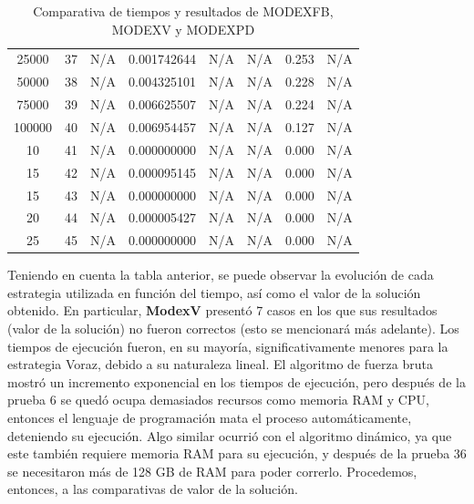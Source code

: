 \documentclass[letterpaper,10pt]{article}
\begin{document}
\begin{table}[H]
{\begin{tabular}{|c|c|c|c|c|c|c|c|}
      25000 & 37  & N/A        & \cellcolor{sgreen}0.001742644 & N/A & N/A    & \cellcolor{syellow}0.253  & N/A    \\
      50000 & 38  & N/A        & \cellcolor{sgreen}0.004325101 & N/A & N/A    & \cellcolor{syellow}0.228  & N/A    \\
      75000 & 39  & N/A        & \cellcolor{sgreen}0.006625507 & N/A & N/A    & \cellcolor{syellow}0.224  & N/A    \\
      100000 & 40 & N/A        & \cellcolor{sgreen}0.006954457 & N/A & N/A    & \cellcolor{syellow}0.127  & N/A    \\
      10   & 41   & N/A        & \cellcolor{sgreen}0.000000000 & N/A & N/A    & \cellcolor{syellow}0.000  & N/A    \\
      15   & 42   & N/A        & \cellcolor{sgreen}0.000095145 & N/A & N/A    & \cellcolor{syellow}0.000  & N/A    \\
      15   & 43   & N/A        & \cellcolor{sgreen}0.000000000 & N/A & N/A    & \cellcolor{syellow}0.000  & N/A    \\
      20   & 44   & N/A        & \cellcolor{sgreen}0.000005427 & N/A & N/A    & \cellcolor{syellow}0.000  & N/A    \\
      25   & 45   & N/A        & \cellcolor{sgreen}0.000000000 & N/A & N/A    & \cellcolor{syellow}0.000  & N/A    \\
      \hline
  \end{tabular}
  }
  \caption{Comparativa de tiempos y resultados de MODEXFB, MODEXV y MODEXPD}
  \label{tab:modex_comparativa}
\end{table}

Teniendo en cuenta la tabla anterior, se puede observar la evolución de cada estrategia utilizada en función del tiempo, así como el valor de la solución obtenido. En particular, \textbf{ModexV} presentó 7 casos en los que sus resultados (valor de la solución) no fueron correctos (esto se mencionará más adelante). Los tiempos de ejecución fueron, en su mayoría, significativamente menores para la estrategia Voraz, debido a su naturaleza lineal. El algoritmo de fuerza bruta mostró un incremento exponencial en los tiempos de ejecución, pero después de la prueba 6 se quedó ocupa demasiados recursos como memoria RAM y CPU, entonces el lenguaje de programación mata el proceso automáticamente, deteniendo su ejecución. Algo similar ocurrió con el algoritmo dinámico, ya que este también requiere memoria RAM para su ejecución, y después de la prueba 36 se necesitaron más de 128 GB de RAM para poder correrlo. Procedemos, entonces, a las comparativas de valor de la solución.
\end{document}
